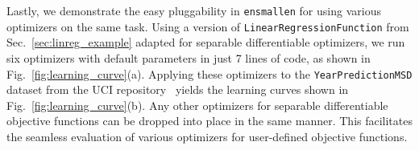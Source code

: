 \documentclass{article}
\begin{document}
%

Lastly, we demonstrate the easy pluggability in {\tt ensmallen}
for using various optimizers on the same task.
Using a version of \texttt{\small LinearRegressionFunction} from Sec.~\ref{sec:linreg_example}
adapted for separable differentiable optimizers,
we run six optimizers with default parameters in just 7 lines of code,
as shown in Fig.~\ref{fig:learning_curve}(a).
Applying these optimizers to the \texttt{\small YearPredictionMSD}
dataset from the UCI repository~\cite{ucimlrepository}
yields the learning curves shown in Fig.~\ref{fig:learning_curve}(b).
Any other optimizers for separable differentiable objective
functions can be dropped into place in the same manner.
This facilitates the seamless evaluation of various optimizers
for user-defined objective functions.
\end{document}
